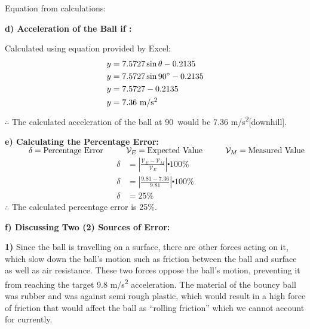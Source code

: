 \documentclass[12pt,letterpaper]{article}
\newcommand\tab[1][1cm]{\hspace*{#1}}
\begin{document}
\noindent
\tab Equation from calculations: \\
\vspace{-4mm}

\noindent
\textbf{\tab d) Acceleration of the Ball if \textdegree:}

\noindent
\tab Calculated using equation provided by Excel:
\vspace{-4mm}
\[
	\begin{aligned}
		y & =7.5727\sin \theta - 0.2135         \\
		y & =7.5727\sin 90\degree -0.2135       \\
		y & =7.5727 - 0.2135                    \\
		y & =7.36~\text{m/s\textsuperscript{2}}
	\end{aligned}
\]
\vspace{-8mm}
\noindent
\tab $\therefore$ The calculated acceleration of the ball at 90\textdegree\ would be 7.36 m/s\textsuperscript{2}[downhill].

\vspace{12mm}
\noindent
\textbf{\tab e) Calculating the Percentage Error:}\\
\noindent
\tab $ \tab \delta = \text{Percentage Error} \tab \mathcal{V}_{E} = \text{Expected Value} \tab \mathcal{V}_{M} = \text{Measured Value}$
\[
	\begin{aligned}
		\delta & = \left\lvert \frac{ \mathcal{V}_{E} - \mathcal{V}_{M} }{\mathcal{V}_{E}} \right\rvert \centerdot 100\% \\
		\delta & = \left\lvert \frac{9.81-7.36}{9.81}\right\rvert \centerdot 100\%                                       \\
		\delta & = 25\%
	\end{aligned}
\]
\vspace{-12mm}
\noindent
\tab $\therefore$ The calculated percentage error is 25\%.

\newpage

\noindent
\textbf{\tab f) Discussing Two (2) Sources of Error:}

\noindent
\tab \textbf{1)} Since the ball is travelling on a surface, there are other forces acting on it, which \tab slow down the ball’s motion such as friction between the ball and surface as well as \tab air resistance. These two forces oppose the ball’s motion, preventing it from reaching \tab the target 9.8 m/s\textsuperscript{2} acceleration. The material of the bouncy ball was rubber and was \tab against semi rough plastic, which would result in a high force of friction that would \tab affect the ball as “rolling friction” which we cannot account for currently.
\end{document}
